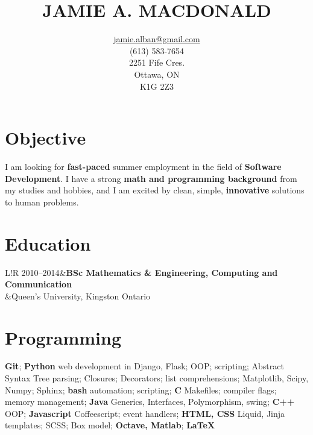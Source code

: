 \documentclass[11pt]{article}
\title{JAMIE A. MACDONALD}
\author{\href{mailto:jamie.alban@gmail.com}{jamie.alban@gmail.com}\\(613) 583-7654\\2251 Fife Cres.\\Ottawa, ON\\K1G 2Z3}
\date{}
\newcommand\VRule{\color{lightgray}\vrule width 0.5pt}
\begin{document}
\begin{minipage}{0.2\textwidth}
\hspace{0em}
\end{minipage}
\begin{minipage}{0.55\textwidth}
\vspace{-3em}
\maketitle
\end{minipage}
\begin{minipage}{0.25\textwidth}
\end{minipage}
\thispagestyle{fancy}
\vspace{-2.5em}
\section*{Objective}
I am looking for \textbf{fast-paced} summer employment in the field of \textbf{Software Development}. I have a strong \textbf{math and programming background} from my studies and hobbies, and I am excited by clean, simple, \textbf{innovative} solutions to human problems.
\section*{Education}
\begin{tabular}{L!{\VRule}R}
2010--2014&{\bf BSc Mathematics \& Engineering, Computing and Communication}\\
          &{Queen's University, Kingston Ontario}\\
\end{tabular}
\section*{Programming}
\textbf{Git}; \textbf{Python} web development in Django, Flask; OOP; scripting; Abstract Syntax Tree parsing; Closures; Decorators; list comprehensions; Matplotlib, Scipy, Numpy; Sphinx; \textbf{bash} automation; scripting; \textbf{C} Makefiles; compiler flags; memory management; \textbf{Java} Generics, Interfaces, Polymorphism, swing; \textbf{C++} OOP; \textbf{Javascript} Coffeescript; event handlers; \textbf{HTML, CSS} Liquid, Jinja templates; SCSS; Box model; \textbf{Octave, Matlab}; \textbf{LaTeX}
\end{document}
